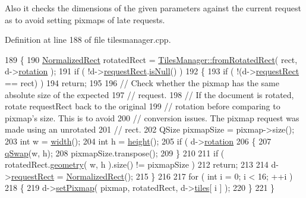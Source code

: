 Also it checks the dimensions of the given parameters against the current request as to avoid setting pixmaps of late requests. 

Definition at line 188 of file tilesmanager.\+cpp.


\begin{DoxyCode}
189 \{
190     \hyperlink{classOkular_1_1NormalizedRect}{NormalizedRect} rotatedRect = \hyperlink{classOkular_1_1TilesManager_a3471602199e2194087e90a3970d07c6c}{TilesManager::fromRotatedRect}( 
      rect, d->\hyperlink{classTilesManager_1_1Private_a7f3af32831b85f1c108fb428b9f634d2}{rotation} );
191     \textcolor{keywordflow}{if} ( !d->\hyperlink{classTilesManager_1_1Private_a7202a07fb2d4f9d1035b6e65429cc37d}{requestRect}.\hyperlink{classOkular_1_1NormalizedRect_a8f9a332a6247f4716d23513af00ac045}{isNull}() )
192     \{
193         \textcolor{keywordflow}{if} ( !(d->\hyperlink{classTilesManager_1_1Private_a7202a07fb2d4f9d1035b6e65429cc37d}{requestRect} == rect) )
194             \textcolor{keywordflow}{return};
195 
196         \textcolor{comment}{// Check whether the pixmap has the same absolute size of the expected}
197         \textcolor{comment}{// request.}
198         \textcolor{comment}{// If the document is rotated, rotate requestRect back to the original}
199         \textcolor{comment}{// rotation before comparing to pixmap's size. This is to avoid}
200         \textcolor{comment}{// conversion issues. The pixmap request was made using an unrotated}
201         \textcolor{comment}{// rect.}
202         QSize pixmapSize = pixmap->size();
203         \textcolor{keywordtype}{int} w = \hyperlink{classOkular_1_1TilesManager_a88a40f389b20ca54314754aff2392889}{width}();
204         \textcolor{keywordtype}{int} h = \hyperlink{classOkular_1_1TilesManager_a4a2fc0597872d6cd291630c2e4bf6986}{height}();
205         \textcolor{keywordflow}{if} ( d->\hyperlink{classTilesManager_1_1Private_a7f3af32831b85f1c108fb428b9f634d2}{rotation} %
206         \{
207             \hyperlink{htmlextension_8h_a6aa0d61b42274f15f4a693b0c7bea484}{qSwap}(w, h);
208             pixmapSize.transpose();
209         \}
210 
211         \textcolor{keywordflow}{if} ( rotatedRect.\hyperlink{classOkular_1_1NormalizedRect_a006897c5fcff2c3a97b4141f1a967513}{geometry}( w, h ).size() != pixmapSize )
212             \textcolor{keywordflow}{return};
213 
214         d->\hyperlink{classTilesManager_1_1Private_a7202a07fb2d4f9d1035b6e65429cc37d}{requestRect} = \hyperlink{classOkular_1_1NormalizedRect}{NormalizedRect}();
215     \}
216 
217     \textcolor{keywordflow}{for} ( \textcolor{keywordtype}{int} i = 0; i < 16; ++i )
218     \{
219         d->\hyperlink{classTilesManager_1_1Private_a95b185ba208c1492a7c98f9d415c667e}{setPixmap}( pixmap, rotatedRect, d->\hyperlink{classTilesManager_1_1Private_a012e2cd82b699c8338004bb96dfc0402}{tiles}[ i ] );
220     \}
221 \}
\end{DoxyCode}
